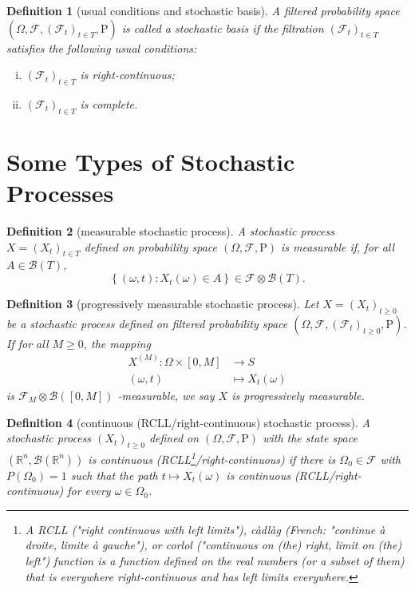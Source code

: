 \documentclass{report}
\newtheorem{definition}{Definition}[section]
\theoremstyle{nonumberplain}
\begin{document}
\begin{definition}[usual conditions and stochastic basis]
	A filtered probability space $(\Omega,\mathcal{F},(\mathcal{F}_{t})_{t\in T },\mathrm{P})$ is called a \emph{stochastic basis} if the filtration $(\mathcal{F}_{t})_{t\in T }$ satisfies the following \emph{usual conditions}:
	\begin{enumerate}[(i)]
		\item $(\mathcal{F}_{t})_{t\in T }$ is right-continuous;
		\item $(\mathcal{F}_{t})_{t\in T }$ is complete.
	\end{enumerate}
\end{definition}

\section{Some Types of Stochastic Processes}

\begin{definition}[measurable stochastic process]
	A stochastic process $X=(X_t)_{t\in T}$ defined on probability space $(\Omega,\mathcal{F},\mathrm{P})$ is \emph{measurable} if, for all $A \in \mathcal{B}\left(T\right)$,
	\[
	\left\{( \omega,t): X_{t}(\omega) \in A\right\} \in \mathcal{F}\otimes \mathcal{B}(T) .
	\]
\end{definition}

\begin{definition}[progressively measurable stochastic process]
	Let $X=(X_t)_{t\ge0}$ be a stochastic process defined on filtered probability space $(\Omega,\mathcal{F},(\mathcal{F}_{t})_{t\ge0},\mathrm{P})$. If for all $M\ge0$, the mapping
	\begin{align*}
	X^{(M)}: \Omega \times [0, M]&\longrightarrow S\\
	(\omega,t)&\longmapsto X_t(\omega)
	\end{align*}
	is $\mathcal{F}_M\otimes \mathcal{B}([0,M])$ -measurable, we say $X$ is \emph{progressively measurable}.
\end{definition}



\begin{definition}[continuous (RCLL/right-continuous) stochastic process]
	A stochastic process $(X_t)_{t\ge0}$ defined on $(\Omega,\mathcal{F},\mathrm{P})$ with the state space $(\mathbb{R}^n,\mathcal{B}(\mathbb{R}^n))$ is continuous (RCLL\footnote{A RCLL ("right continuous with left limits"), càdlàg (French: "continue à droite, limite à gauche"), or corlol ("continuous on (the) right, limit on (the) left") function is a function defined on the real numbers (or a subset of them) that is everywhere right-continuous and has left limits everywhere.}/right-continuous) if there	is $\Omega_0\in\mathcal{F}$  with $P(\Omega_0) = 1$ such that the path $t\mapsto X_t(\omega)$ is continuous (RCLL/right-continuous) for every $\omega\in\Omega_0$.
\end{definition}
\end{document}
